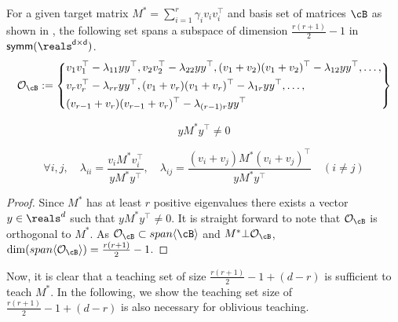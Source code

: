 \begin{lemma}\label{lemma: orthocons}
    For a  given target matrix $M^* = \sum_{i=1}^r \gamma_iv_iv_i^{\top}$ and basis set of matrices $\cB$ as shown in , the following set spans a subspace of dimension $\frac{r(r+1)}{2} -1$ in $\sf{symm}(\reals^{d \times d})$. 
\begin{equation*}
\mathcal{O}_{\cB} := \left\{
\begin{aligned}
&v_1v_1^{\top} - \lambda_{11}yy^{\top}, v_2v_2^{\top} - \lambda_{22}yy^{\top}, (v_1 + v_2)(v_1 + v_2)^{\top} - \lambda_{12}yy^{\top}, \ldots,\\
&v_rv_r^{\top} - \lambda_{rr}yy^{\top}, (v_1 + v_r)(v_1 + v_r)^{\top} - \lambda_{1r}yy^{\top}, \ldots, \\
&(v_{r-1} + v_r)(v_{r-1} + v_r)^{\top} - \lambda_{(r-1)r}yy^{\top}
\end{aligned}
\right\}
\end{equation*}

\begin{equation*}
yM^*y^{\top} \neq 0
\end{equation*}

\begin{equation*}
\forall i,j,\quad \lambda_{ii} = \frac{v_iM^*v_i^{\top}}{yM^*y^{\top}}, \quad \lambda_{ij} = \frac{(v_i + v_j)M^*(v_i+ v_j)^{\top}}{yM^*y^{\top}} \quad (i \neq j)
\end{equation*}


\end{lemma}
\begin{proof}
    Since $M^*$ has at least $r$ positive eigenvalues there exists a vector $y \in \reals^d$ such that $yM^*y^{\top} \neq 0$. It is straight forward to note that $\mathcal{O}_{\cB}$ is orthogonal to $M^*$. As $\mathcal{O}_{\cB} \subset span\langle \cB \rangle$ and $M^* \bot \mathcal{O}_{\cB}$, $\dim(span\langle \mathcal{O}_{\cB} \rangle) = \frac{r(r+1)}{2} -1$. 
\end{proof}

Now, it is clear that a teaching set of size $\frac{r(r+1)}{2} - 1 + (d -r)$ is sufficient to teach $M^*$. In the following, we show the teaching set size of $\frac{r(r+1)}{2} - 1 + (d -r)$ is also necessary for oblivious teaching.

